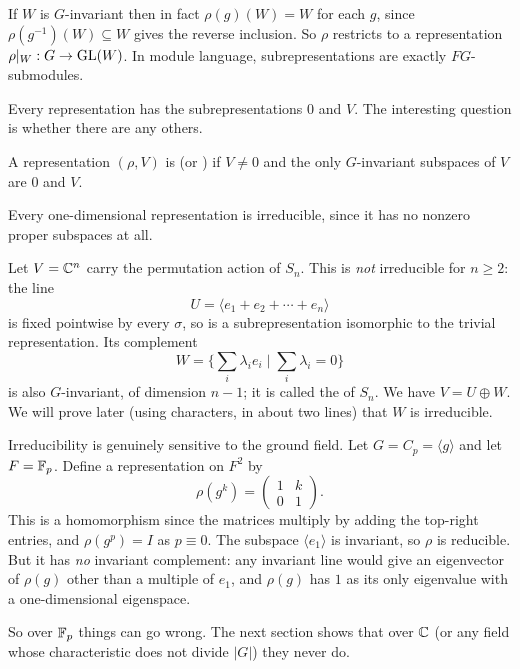 \documentclass[a4paper]{scrartcl}
\newcommand{\gen}[1]{\langle #1 \rangle}
\begin{document}
If $W$ is $G$-invariant then in fact $\rho(g)(W) = W$ for each $g$, since $\rho(g^{-1})(W) \subseteq W$ gives the reverse inclusion. So $\rho$ restricts to a representation $\rho|_W : G \to \operatorname{GL}(W)$. In module language, subrepresentations are exactly $FG$-submodules.

Every representation has the  subrepresentations $0$ and $V$. The interesting question is whether there are any others.

\begin{definition}[Irreducible]
	A representation $(\rho, V)$ is  (or ) if $V \neq 0$ and the only $G$-invariant subspaces of $V$ are $0$ and $V$.
\end{definition}

\begin{example}
	Every one-dimensional representation is irreducible, since it has no nonzero proper subspaces at all.
\end{example}

\begin{example}
	Let $V = \mathbb{C}^n$ carry the permutation action of $S_n$. This is \emph{not} irreducible for $n \geq 2$: the line
	$$U = \gen{e_1 + e_2 + \cdots + e_n}$$
	is fixed pointwise by every $\sigma$, so is a subrepresentation isomorphic to the trivial representation. Its complement
	$$W = \Big\{ \sum_i \lambda_i e_i \; \Big| \; \sum_i \lambda_i = 0 \Big\}$$
	is also $G$-invariant, of dimension $n-1$; it is called the  of $S_n$. We have $V = U \oplus W$. We will prove later (using characters, in about two lines) that $W$ is irreducible.
\end{example}

\begin{example}
	Irreducibility is genuinely sensitive to the ground field. Let $G = C_p = \gen{g}$ and let $F = \mathbb{F}_p$. Define a representation on $F^2$ by
	$$\rho(g^k) = \begin{pmatrix} 1 & k \\ 0 & 1 \end{pmatrix}.$$
	This is a homomorphism since the matrices multiply by adding the top-right entries, and $\rho(g^p) = I$ as $p \equiv 0$. The subspace $\gen{e_1}$ is invariant, so $\rho$ is reducible. But it has \emph{no} invariant complement: any invariant line would give an eigenvector of $\rho(g)$ other than a multiple of $e_1$, and $\rho(g)$ has $1$ as its only eigenvalue with a one-dimensional eigenspace.

	So over $\mathbb{F}_p$ things can go wrong. The next section shows that over $\mathbb{C}$ (or any field whose characteristic does not divide $|G|$) they never do.
\end{example}
\end{document}
